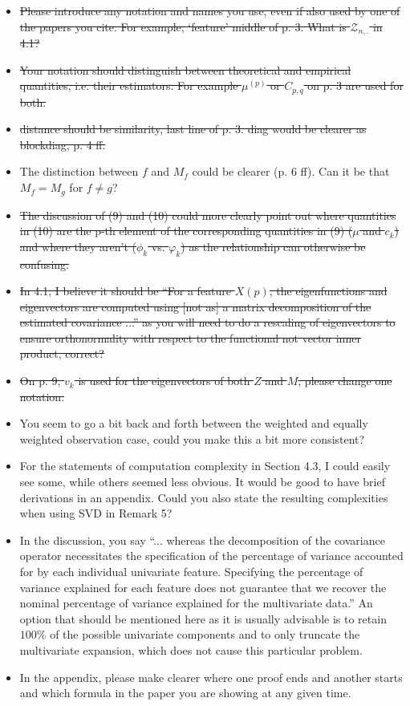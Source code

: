 \documentclass[11pt]{article}
\begin{document}
\begin{itemize}
  \item  \sout{Please introduce any notation and names you use, even if also used by one of the papers you cite. For example, ‘feature’ middle of p. 3. What is $\mathcal{Z}_{n,.}$ in 4.1?}
  \item \sout{Your notation should distinguish between theoretical and empirical quantities, i.e. their estimators. For example $\mu^{(p)}$ or $C_{p,q}$ on p. 3 are used for both.}
  \item \sout{distance should be similarity, last line of p. 3. diag would be clearer as blockdiag, p. 4 ff.}
  \item The distinction between $f$ and $M_f$ could be clearer (p. 6 ff). Can it be that $M_f = M_g$ for $f \neq g$?
  \item \sout{The discussion of (9) and (10) could more clearly point out where quantities in (10) are the p-th element of the corresponding quantities in (9) ($\mu$ and $c_k$) and where they aren't ($\phi_k$ vs. $\varphi_k$) as the relationship can otherwise be confusing.}
  \item \sout{In 4.1, I believe it should be “For a feature $X(p)$, the eigenfunctions and eigenvectors are computed using [not as] a matrix decomposition of the estimated covariance ...” as you will need to do a rescaling of eigenvectors to ensure orthonormality with respect to the functional not vector inner product, correct?}
  \item \sout{On p. 9, $v_k$ is used for the eigenvectors of both $Z$ and $M$, please change one notation.}
  \item You seem to go a bit back and forth between the weighted and equally weighted observation case, could you make this a bit more consistent?
  \item For the statements of computation complexity in Section 4.3, I could easily see some, while others seemed less obvious. It would be good to have brief derivations in an appendix. Could you also state the resulting complexities when using SVD in Remark 5?
  \item In the discussion, you say “... whereas the decomposition of the covariance operator necessitates the specification of the percentage of variance accounted for by each individual univariate feature. Specifying the percentage of variance explained for each feature does not guarantee that we recover the nominal percentage of variance explained for the multivariate data.” An option that should be mentioned here as it is usually advisable is to retain $100\%$ of the possible univariate components and to only truncate the multivariate expansion, which does not cause this particular problem.
  \item In the appendix, please make clearer where one proof ends and another starts and which formula in the paper you are showing at any given time.
\end{itemize}
\end{document}
